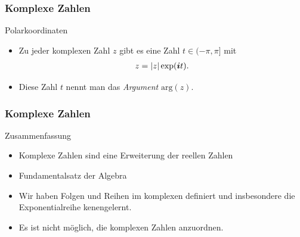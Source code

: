 \documentclass{beamer}
\def\vec#1{\mathchoice{\mbox{\boldmath$\displaystyle#1$}}
{\mbox{\boldmath$\textstyle#1$}}
{\mbox{\boldmath$\scriptstyle#1$}}
{\mbox{\boldmath$\scriptscriptstyle#1$}}}
\renewcommand{\emph}[1]{{\textcolor{solarizedRed}{\itshape #1}}}
\newcommand\ii{\vec i}
\renewcommand{\oe}{\"o}
\newcommand{\mytitle}{Komplexe Zahlen}
\begin{document}
\begin{frame}\frametitle{\mytitle}
	\begin{block}{Polarkoordinaten}
		\begin{itemize}
			\item Zu jeder komplexen Zahl $z$ gibt es eine Zahl $t\in(-\pi,\pi]$ mit
				\begin{align*}
					z=|z|\exp(\ii t).
				\end{align*}
			\item Diese Zahl $t$ nennt man das \emph{Argument} $\mbox{arg}(z)$.
		\end{itemize}
	\end{block}
\end{frame}

\begin{frame}\frametitle{\mytitle}
	\begin{block}{Zusammenfassung}
		\begin{itemize}
			\item Komplexe Zahlen sind eine Erweiterung der reellen Zahlen
			\item Fundamentalsatz der Algebra
			\item Wir haben Folgen und Reihen im komplexen definiert und insbesondere die Exponentialreihe kenengelernt.
			\item Es ist nicht m\oe glich, die komplexen Zahlen anzuordnen.
		\end{itemize}
	\end{block}
\end{frame}
\end{document}

